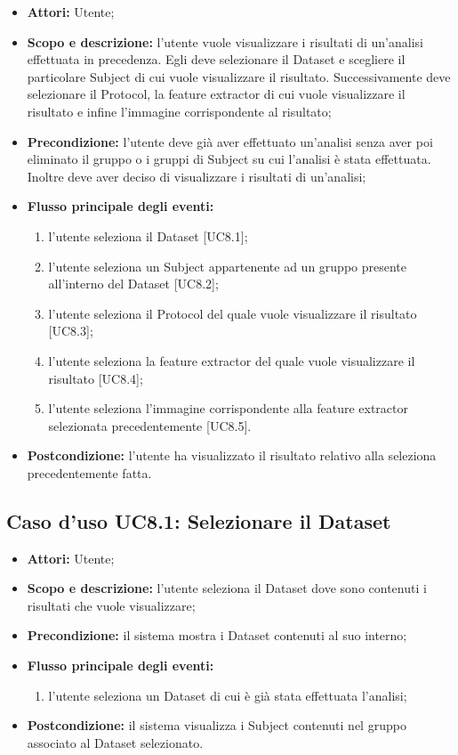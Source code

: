 \begin{itemize}
\item \textbf{Attori:} Utente;
\item \textbf{Scopo e descrizione:} l'utente vuole visualizzare i risultati di un'analisi effettuata in precedenza. Egli deve selezionare il Dataset\glossario{} e scegliere il particolare Subject\glossario{} di cui vuole visualizzare il risultato. Successivamente deve selezionare il Protocol\glossario{}, la feature extractor\glossario{} di cui vuole visualizzare il risultato e infine l'immagine corrispondente al risultato;
\item \textbf{Precondizione:} l'utente deve già aver effettuato un'analisi senza aver poi eliminato il gruppo o i gruppi di Subject\glossario{} su cui l'analisi è stata effettuata. Inoltre deve aver deciso di visualizzare i risultati di un'analisi;
\item \textbf{Flusso principale degli eventi:}
\begin{enumerate}
\item l'utente seleziona il Dataset\glossario{} [UC8.1];
\item l'utente seleziona un Subject\glossario{} appartenente ad un gruppo presente all'interno del Dataset\glossario{} [UC8.2];
\item l'utente seleziona il Protocol\glossario{} del quale vuole visualizzare il risultato [UC8.3];
\item l'utente seleziona la feature extractor\glossario{} del quale vuole visualizzare il risultato [UC8.4];
\item l'utente seleziona l'immagine corrispondente alla feature extractor\glossario{} selezionata precedentemente [UC8.5].
\end{enumerate}
\item \textbf{Postcondizione:} l'utente ha visualizzato il risultato relativo alla seleziona precedentemente fatta.
\end{itemize}

\subsection{Caso d'uso UC8.1: Selezionare il Dataset}
\begin{itemize}
\item \textbf{Attori:} Utente;
\item \textbf{Scopo e descrizione:} l'utente seleziona il Dataset\glossario{} dove sono contenuti i risultati che vuole visualizzare;
\item \textbf{Precondizione:} il sistema mostra i Dataset\glossario{} contenuti al suo interno;
\item \textbf{Flusso principale degli eventi:}
\begin{enumerate}
\item l'utente seleziona un Dataset\glossario{} di cui è già stata effettuata l'analisi; 
\end{enumerate}
\item \textbf{Postcondizione:} il sistema visualizza i Subject\glossario{} contenuti nel gruppo associato al Dataset\glossario{} selezionato.
\end{itemize}


